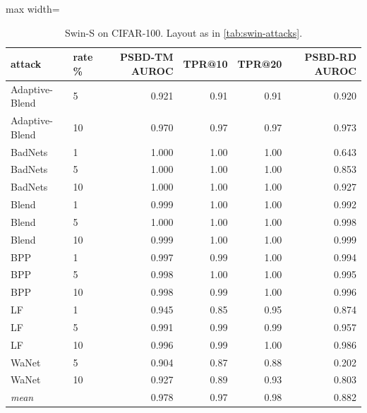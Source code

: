 \begin{table}[htbp]
\centering
\small
\caption{Swin-S on CIFAR-100. Layout as in \cref{tab:swin-attacks}.}
\label{tab:swin-attacks-cifar-100}
\begin{adjustbox}{max width=\linewidth}
\begin{tabular}{llrrrr}
\toprule
attack & rate \% & PSBD-TM AUROC & TPR@10 & TPR@20 & PSBD-RD AUROC \\
\midrule
Adaptive-Blend & 5 & 0.921 & 0.91 & 0.91 & 0.920 \\
Adaptive-Blend & 10 & 0.970 & 0.97 & 0.97 & 0.973 \\
BadNets & 1 & 1.000 & 1.00 & 1.00 & 0.643 \\
BadNets & 5 & 1.000 & 1.00 & 1.00 & 0.853 \\
BadNets & 10 & 1.000 & 1.00 & 1.00 & 0.927 \\
Blend & 1 & 0.999 & 1.00 & 1.00 & 0.992 \\
Blend & 5 & 1.000 & 1.00 & 1.00 & 0.998 \\
Blend & 10 & 0.999 & 1.00 & 1.00 & 0.999 \\
BPP & 1 & 0.997 & 0.99 & 1.00 & 0.994 \\
BPP & 5 & 0.998 & 1.00 & 1.00 & 0.995 \\
BPP & 10 & 0.998 & 0.99 & 1.00 & 0.996 \\
LF & 1 & 0.945 & 0.85 & 0.95 & 0.874 \\
LF & 5 & 0.991 & 0.99 & 0.99 & 0.957 \\
LF & 10 & 0.996 & 0.99 & 1.00 & 0.986 \\
WaNet & 5 & 0.904 & 0.87 & 0.88 & 0.202 \\
WaNet & 10 & 0.927 & 0.89 & 0.93 & 0.803 \\
\rowcolor{black!8}\emph{mean} &  & 0.978 & 0.97 & 0.98 & 0.882 \\
\bottomrule
\end{tabular}
\end{adjustbox}
\end{table}

